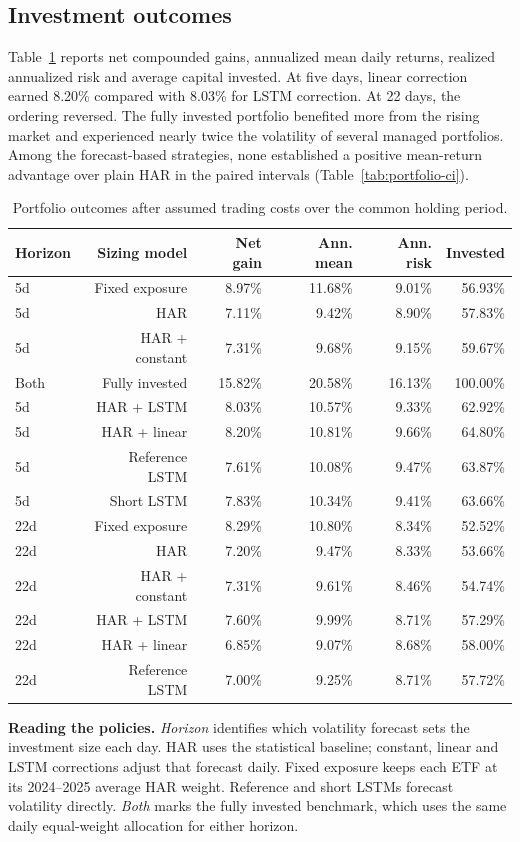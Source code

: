 \documentclass[11pt]{article}
\begin{document}
\subsection{Investment outcomes}
Table~\ref{tab:invest} reports net compounded gains, annualized mean daily returns, realized annualized risk and average capital invested. At five days, linear correction earned 8.20\% compared with 8.03\% for LSTM correction. At 22 days, the ordering reversed. The fully invested portfolio benefited more from the rising market and experienced nearly twice the volatility of several managed portfolios. Among the forecast-based strategies, none established a positive mean-return advantage over plain HAR in the paired intervals (Table~\ref{tab:portfolio-ci}).
\begin{table}[htbp]\centering\small\setlength{\tabcolsep}{4pt}\caption{Portfolio outcomes after assumed trading costs over the common holding period.}\label{tab:invest}
\begin{tabular}{lrrrrr}\toprule
Horizon & Sizing model & Net gain & Ann. mean & Ann. risk & Invested \\ \midrule
5d & Fixed exposure & 8.97\% & 11.68\% & 9.01\% & 56.93\% \\
5d & HAR & 7.11\% & 9.42\% & 8.90\% & 57.83\% \\
5d & HAR + constant & 7.31\% & 9.68\% & 9.15\% & 59.67\% \\
Both & Fully invested & 15.82\% & 20.58\% & 16.13\% & 100.00\% \\
5d & HAR + LSTM & 8.03\% & 10.57\% & 9.33\% & 62.92\% \\
5d & HAR + linear & 8.20\% & 10.81\% & 9.66\% & 64.80\% \\
5d & Reference LSTM & 7.61\% & 10.08\% & 9.47\% & 63.87\% \\
5d & Short LSTM & 7.83\% & 10.34\% & 9.41\% & 63.66\% \\
22d & Fixed exposure & 8.29\% & 10.80\% & 8.34\% & 52.52\% \\
22d & HAR & 7.20\% & 9.47\% & 8.33\% & 53.66\% \\
22d & HAR + constant & 7.31\% & 9.61\% & 8.46\% & 54.74\% \\
22d & HAR + LSTM & 7.60\% & 9.99\% & 8.71\% & 57.29\% \\
22d & HAR + linear & 6.85\% & 9.07\% & 8.68\% & 58.00\% \\
22d & Reference LSTM & 7.00\% & 9.25\% & 8.71\% & 57.72\% \\\bottomrule\end{tabular}\par\vspace{6pt}\begin{minipage}{.97\linewidth}\small\setlength{\parskip}{4pt}
\textbf{Reading the policies.} \emph{Horizon} identifies which volatility forecast sets the investment size each day. HAR uses the statistical baseline; constant, linear and LSTM corrections adjust that forecast daily. Fixed exposure keeps each ETF at its 2024--2025 average HAR weight. Reference and short LSTMs forecast volatility directly. \emph{Both} marks the fully invested benchmark, which uses the same daily equal-weight allocation for either horizon.


\end{minipage}
\end{table}
\end{document}
